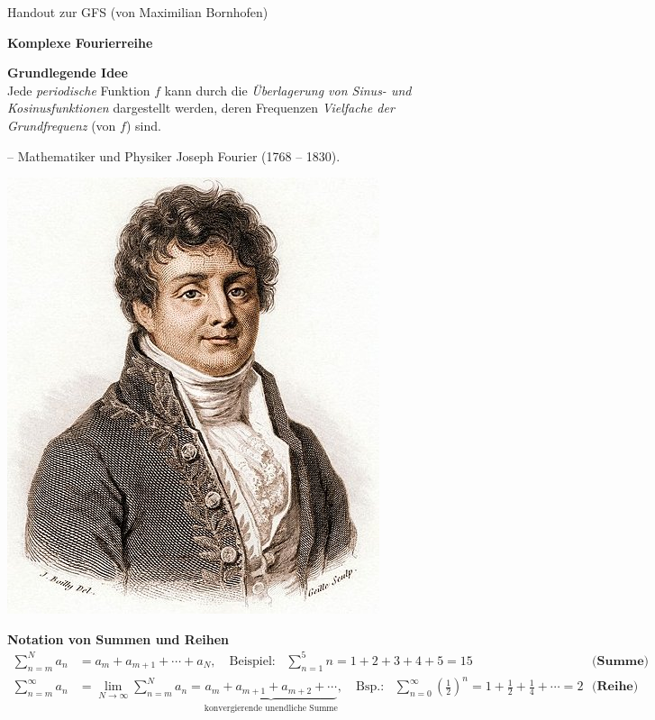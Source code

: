 \documentclass[12pt]{article}
\begin{document}
\setlength\parindent{0pt}

\begin{center}
	Handout zur GFS (von Maximilian Bornhofen)
	
	\textbf{{\LARGE Komplexe Fourierreihe}}
\end{center}

\begin{minipage}{0.79\linewidth}
	\textbf{\large Grundlegende Idee} \\[1ex]
	Jede \textit{periodische} Funktion $f$ kann durch die \textit{Überlagerung von Sinus- und Kosinusfunktionen} dargestellt werden, deren Frequenzen \textit{Vielfache der Grundfrequenz} (von $f$) sind.
	
	\hspace*{5ex}– Mathematiker und Physiker Joseph Fourier (1768 – 1830).
\end{minipage}
\hspace*{2ex}
\begin{minipage}{0.19\linewidth}
	\includegraphics[width=\linewidth]{fourier.jpg}
\end{minipage}

\textbf{\large Notation von Summen und Reihen}
\begin{align*}
	\sum_{n=m}^{N} a_n &= a_m + a_{m+1} + \cdots + a_N, \quad \text{Beispiel:} \;\;\; \sum_{n=1}^{5} n = 1+2+3+4+5 = 15 & \textbf{(Summe)}\\[1ex]
	\sum_{n=m}^{\infty} a_n &= \lim_{N \rightarrow \infty} \sum_{n=m}^{N} a_n = \underbrace{a_m + a_{m+1} + a_{m+2} + \cdots}_{\text{konvergierende unendliche Summe}} , \quad \text{Bsp.:} \;\;\; \sum_{n=0}^{\infty} \left(\frac{1}{2}\right)^n = 1 + \frac{1}{2} + \frac{1}{4} + \cdots = 2 & \textbf{(Reihe)}
\end{align*}
\end{document}
